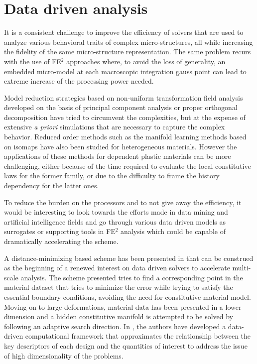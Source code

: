 \section{Data driven analysis}

It is a consistent challenge to improve the efficiency of solvers that are used to analyze various behavioral traits of complex micro-structures, all while increasing the fidelity of the same micro-structure representation. The same problem recurs with the use of FE$ ^2 $ approaches where, to avoid the loss of generality, an embedded micro-model at each macroscopic integration gauss point can lead to extreme increase of the processing power needed. 

Model reduction strategies based on non-uniform transformation field analysis developed on the basis of principal component analysis\cite{michelModelreductionApproachMicromechanics2016,michelNonuniformTransformationField2003,jolliffePrincipalComponentAnalysis2014} or proper orthogonal decomposition\cite{yvonnetReducedModelMultiscale2007} have tried to circumvent the complexities, but at the expense of extensive \textit{a priori} simulations that are necessary to capture the complex behavior. Reduced order methods such as the manifold learning methods based on isomaps have also been studied for heterogeneous materials\cite{bhattacharjeeNonlinearManifoldbasedReduced2016}. However the applications of these methods for dependent plastic materials can be more challenging, either because of the time required to evaluate the local constitutive laws for the former family, or due to the difficulty to frame the history dependency for the latter ones.

To reduce the burden on the processors and to not give away the efficiency, it would be interesting to look towards the efforts made in data mining and artificial intelligence fields and go through various data driven models as surrogates or supporting tools in FE$ ^2 $ analysis which could be capable of dramatically accelerating the scheme.

A distance-minimizing based scheme has been presented in \cite{kirchdoerferDatadrivenComputationalMechanics2016} that can be construed as the beginning of a renewed interest on data driven solvers to accelerate multi-scale analysis. The scheme presented tries to find a corresponding point in the material dataset that tries to minimize the error while trying to satisfy the essential boundary conditions, avoiding the need for constitutive material model. Moving on to large deformations, material data has been presented in a lower dimension and a hidden constitutive manifold is attempted to be solved by following an adaptive search direction\cite{chinestaDataDrivenComputationalPlasticity2017}. In \cite{bessaFrameworkDatadrivenAnalysis2017}, the authors have developed a data-driven computational framework that approximates the relationship between the key descriptors of each design and the quantities of interest to address the issue of high dimensionality of the problems. 

